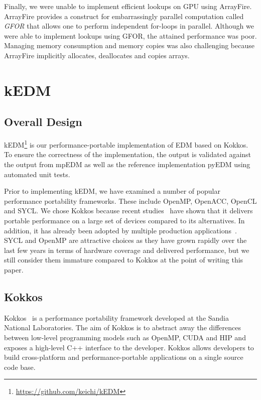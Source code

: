 \documentclass[sigconf]{acmart}
\begin{document}
Finally, we were unable to implement efficient lookups on GPU using ArrayFire.
ArrayFire provides a construct for embarrassingly parallel computation called
\textit{GFOR} that allows one to perform independent for-loops in parallel.
Although we were able to implement lookups using GFOR, the attained
performance was poor. Managing memory consumption and memory copies was also
challenging because ArrayFire implicitly allocates, deallocates and copies
arrays.

\section{kEDM}\label{sec:proposal}

\subsection{Overall Design}

kEDM\footnote{\url{https://github.com/keichi/kEDM}} is our
performance-portable implementation of EDM based on Kokkos. To ensure the
correctness of the implementation, the output is validated against the output
from mpEDM as well as the reference implementation pyEDM using automated unit
tests.

Prior to implementing kEDM, we have examined a number of popular performance
portability frameworks. These include OpenMP, OpenACC, OpenCL and SYCL\@. We
chose Kokkos  because recent studies~\cite{Martineau2017, Deakin2019, Deakin2020}
have shown that it delivers portable performance on a large set of devices
compared to its alternatives. In addition, it has already been adopted by
multiple production applications~\cite{Sprague2020,Holmen2017,Demeshko2019}.
SYCL and OpenMP are attractive choices as they have grown rapidly over the
last few years in terms of hardware coverage and delivered performance, but we
still consider them immature compared to Kokkos at the point of writing this
paper.

\subsection{Kokkos}

Kokkos~\cite{Edwards2014} is a performance portability framework developed at
the Sandia National Laboratories. The aim of Kokkos is to abstract away the
differences between low-level programming models such as OpenMP, CUDA and HIP
and exposes a high-level C++ interface to the developer. Kokkos allows
developers to build cross-platform and performance-portable applications on a
single source code base.
\end{document}
